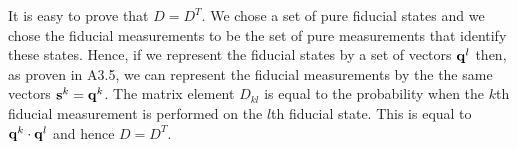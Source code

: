 \documentclass[10pt,twocolumn]{article}
\begin{document}
\vspace{4mm}


\vspace{4mm}

It is easy to prove that $D=D^T$.  We chose a set of pure fiducial
states and we chose the fiducial measurements to be the set of pure
measurements that identify these states.  Hence, if we represent the
fiducial states by a set of vectors ${\bf q}^l$ then, as proven in A3.5,
we can represent the fiducial measurements by the the same vectors ${\bf
s}^k={\bf q}^k$.  The matrix element $D_{kl}$ is equal to the probability when
the $k$th fiducial measurement is performed on the $l$th fiducial state.
This is equal to ${\bf q}^k\cdot{\bf q}^l$ and hence $D=D^T$.

\vspace{4mm}


\vspace{4mm}
\end{document}
